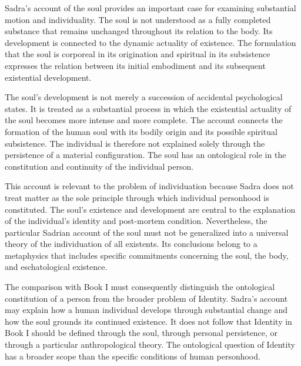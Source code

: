 \label{para:VS.B01.P01.C08.S17.SS12.P001}

Sadra's account of the soul
provides an important case
for examining substantial
motion and individuality.
The soul is not understood
as a fully completed substance
that remains unchanged
throughout its relation to
the body. Its development
is connected to the dynamic
actuality of existence.
The formulation that the
soul is corporeal in its
origination and spiritual
in its subsistence expresses
the relation between its
initial embodiment and
its subsequent existential
development.

\label{para:VS.B01.P01.C08.S17.SS12.P002}

The soul's development is
not merely a succession
of accidental psychological
states. It is treated as
a substantial process in
which the existential actuality
of the soul becomes more
intense and more complete.
The account connects the
formation of the human
soul with its bodily origin
and its possible spiritual
subsistence. The individual
is therefore not explained
solely through the persistence
of a material configuration.
The soul has an ontological
role in the constitution
and continuity of the
individual person.

\label{para:VS.B01.P01.C08.S17.SS12.P003}

This account is relevant
to the problem of individuation
because Sadra does not
treat matter as the sole
principle through which
individual personhood is
constituted. The soul's
existence and development
are central to the explanation
of the individual's identity
and post-mortem condition.
Nevertheless, the particular
Sadrian account of the soul
must not be generalized
into a universal theory
of the individuation of
all existents. Its conclusions
belong to a metaphysics
that includes specific
commitments concerning
the soul, the body, and
eschatological existence.

\label{para:VS.B01.P01.C08.S17.SS12.P004}

The comparison with Book I
must consequently distinguish
the ontological constitution
of a person from the broader
problem of Identity. Sadra's
account may explain how
a human individual develops
through substantial change
and how the soul grounds
its continued existence.
It does not follow that
Identity in Book I should
be defined through the soul,
through personal persistence,
or through a particular
anthropological theory.
The ontological question
of Identity has a broader
scope than the specific
conditions of human personhood.

